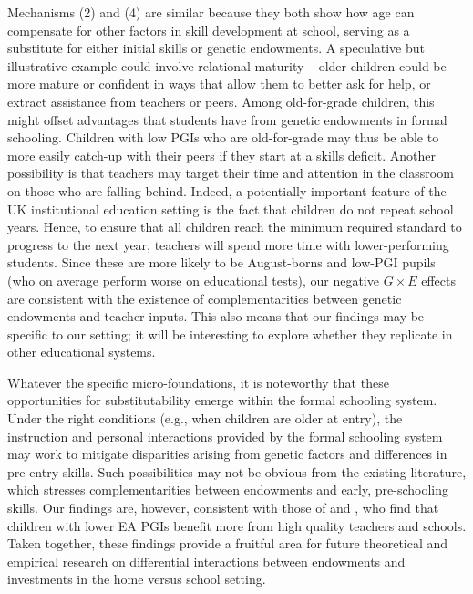 \documentclass[12pt,a4paper]{article}
\begin{document}
\begin{bibunit}
Mechanisms (2) and (4) are similar because they both show how age can compensate for other factors in skill development at school, serving as a substitute for either initial skills or genetic endowments.
A speculative but illustrative example could involve relational maturity -- older children could be more mature or confident in ways that allow them to better ask for help, or extract assistance from teachers or peers. Among old-for-grade children, this might offset advantages that students have from genetic endowments in formal schooling.  Children with low PGIs who are old-for-grade may thus be able to more easily catch-up with their peers if they start at a skills deficit. Another possibility is that teachers may target their time and attention in the classroom on those who are falling behind. 
Indeed, a potentially important feature of the UK institutional education setting is the fact that children do not repeat school years. Hence, to ensure that all children reach the minimum required standard to progress to the next year, teachers will spend more time with lower-performing students. Since these are more likely to be August-borns and low-PGI pupils (who on average perform worse on educational tests), our negative $G \times E$ effects are consistent with the existence of complementarities between genetic endowments and teacher inputs. This also means that our findings may be specific to our setting; it will be interesting to explore whether they replicate in other educational systems.

Whatever the specific micro-foundations, it is noteworthy that these opportunities for substitutability emerge within the formal schooling system. Under the right conditions (e.g., when children are older at entry), the instruction and personal interactions provided by the formal schooling system may work to mitigate disparities arising from genetic factors and differences in pre-entry skills. 
Such possibilities may not be obvious from the existing literature, which stresses complementarities between endowments and early, pre-schooling skills.  Our findings are, however, consistent with those of \citet{arold2022genetic} and \citet{cheesman2022genes}, who find that children with lower EA PGIs benefit more from high quality teachers and schools. Taken together, these findings provide a fruitful area for future theoretical and empirical research on differential interactions between endowments and investments in the home versus school setting.


\end{bibunit}
\end{document}
